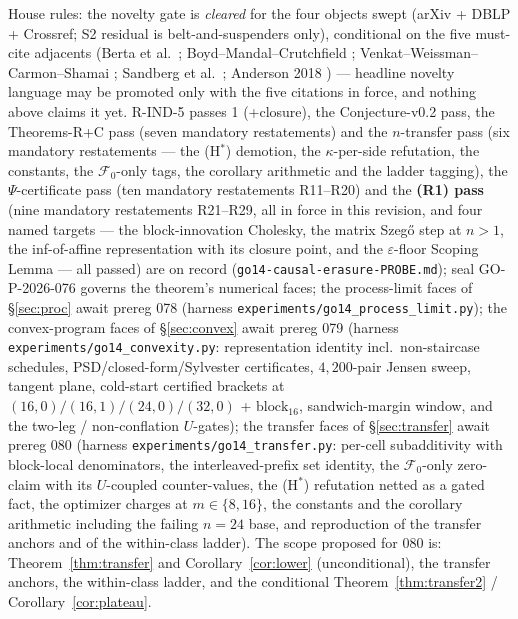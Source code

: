 \documentclass[11pt]{article}
\theoremstyle{definition}
\theoremstyle{remark}
\begin{document}
House rules: the novelty gate is \emph{cleared} for the four
objects swept (arXiv + DBLP + Crossref; S2 residual is
belt-and-suspenders only), conditional on the five must-cite
adjacents (Berta et al.\ \cite{bib:berta18,bib:berta18b};
Boyd--Mandal--Crutchfield \cite{bib:bmc17,bib:bmc16};
Venkat--Weissman--Carmon--Shamai \cite{bib:vwcs13}; Sandberg et al.\
\cite{bib:sandberg14}; Anderson 2018 \cite{bib:anderson18})
--- headline novelty language may be promoted only with the five
citations in force, and nothing above claims it yet. R-IND-5 passes
1 (+closure), the Conjecture-v0.2 pass, the Theorems-R+C pass
(seven mandatory restatements) and the $n$-transfer pass (six
mandatory restatements --- the (H$^\ast$) demotion, the
$\kappa$-per-side refutation, the constants, the
$\mathcal F_0$-only tags, the corollary arithmetic and the
ladder tagging), the $\Psi$-certificate pass (ten mandatory
restatements R11--R20) and the \textbf{(R1) pass} (nine mandatory
restatements R21--R29, all in force in this revision, and four named
targets --- the block-innovation Cholesky, the matrix Szeg\H o step at
$n>1$, the inf-of-affine representation with its closure point, and the
$\varepsilon$-floor Scoping Lemma --- all passed) are
on record (\texttt{go14-causal-erasure-PROBE.md}); seal
GO-P-2026-076 governs the theorem's numerical faces; the
process-limit faces of \S\ref{sec:proc} await prereg 078 (harness
\texttt{experiments/go14\_process\_limit.py}); the convex-program
faces of \S\ref{sec:convex} await prereg 079 (harness
\texttt{experiments/go14\_convexity.py}: representation identity
incl.\ non-staircase schedules, PSD/closed-form/Sylvester
certificates, $4{,}200$-pair Jensen sweep, tangent plane, cold-start
certified brackets at $(16,0)/(16,1)/(24,0)/(32,0)$ +
$\mathrm{block}_{16}$, sandwich-margin window, and the two-leg /
non-conflation $U$-gates); the transfer faces of \S\ref{sec:transfer}
await prereg 080 (harness
\texttt{experiments/go14\_transfer.py}: per-cell subadditivity with
block-local denominators, the interleaved-prefix set identity, the
$\mathcal F_0$-only zero-claim with its $U$-coupled counter-values,
the (H$^\ast$) refutation netted as a gated fact, the optimizer
charges at $m\in\{8,16\}$, the constants and the corollary
arithmetic including the failing $n=24$ base, and reproduction of the
transfer anchors and of the within-class ladder). The scope proposed
for 080 is: Theorem~\ref{thm:transfer} and
Corollary~\ref{cor:lower} (unconditional), the transfer anchors, the
within-class ladder, and the conditional
Theorem~\ref{thm:transfer2} / Corollary~\ref{cor:plateau}.
\end{document}
